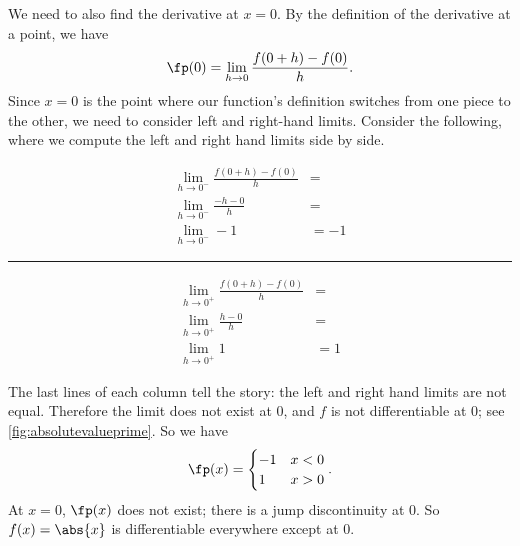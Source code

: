 {We need to also find the derivative at $x=0$. By the definition of the derivative at a point, we have $$\fp(0) = \lim_{h\to0}\frac{f(0+h)-f(0)}{h}.$$ Since $x=0$ is the point where our function's definition switches from one piece to the other, we need to consider left and right-hand limits. Consider the following, where we compute the left and right hand limits side by side.\\
\begin{minipage}[b]{.49\linewidth}
\begin{align*}
\lim_{h\to0^-}\frac{f(0+h)-f(0)}{h} &= \\
\lim_{h\to0^-}\frac{-h-0}{h} &= \\
\lim_{h\to0^-}-1 & =-1
\end{align*}
\end{minipage}\rule{.5pt}{70pt}%
\begin{minipage}[b]{.49\linewidth}
\begin{align*}
\lim_{h\to0^+}\frac{f(0+h)-f(0)}{h} &= \\
\lim_{h\to0^+}\frac{h-0}{h} &= \\
\lim_{h\to0^+}1 & =1
\end{align*}
\end{minipage}
%		
%		

\noindent
The last lines of each column tell the story: the left and right hand limits are not equal. Therefore the limit does not exist at 0, and $f$ is not differentiable at 0; see \autoref{fig:absolutevalueprime}.
So we have $$\fp(x) = \begin{cases} -1 & x<0 \\ 1 & x>0\end{cases}.$$ 
At $x=0$, $\fp(x)$ does not exist; there is a jump discontinuity at 0. So $f(x) = \abs{x}$ is differentiable everywhere except at 0.}

